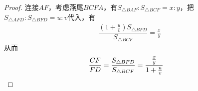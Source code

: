 \begin{proof}
  连接$AF$，考虑燕尾$BCFA$，有$S_{\triangle BAF}:S_{\triangle BCF} = x:y$，把$S_{\triangle AFD}:S_{\triangle BFD}=u:v$代入，有
  \begin{align*}
    \dfrac{(1 + \frac{u}{v})S_{\triangle BFD}}{S_{\triangle BCF}} = \frac{x}{y}
  \end{align*}
  从而
  \begin{align*}
    \frac{CF}{FD}=\dfrac{S_{\triangle BFD}}{S_{\triangle BCF}} = \dfrac{\frac{x}{y}}{1+\frac{u}{v}}&\qedhere
  \end{align*}
\end{proof}